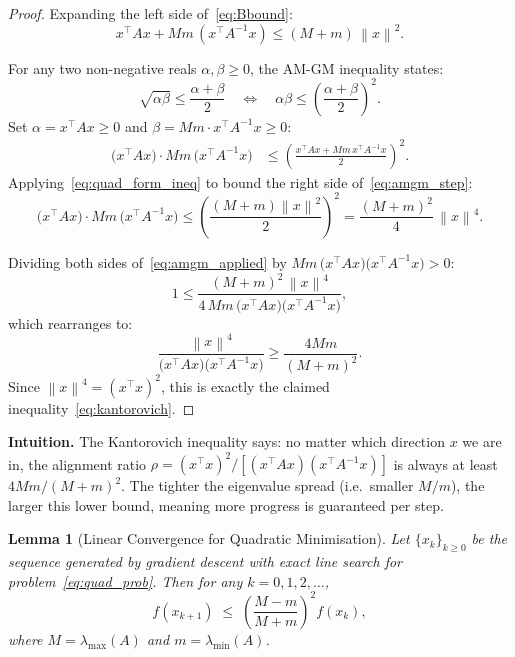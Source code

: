 \documentclass[11pt]{article}
\theoremstyle{definition}
\theoremstyle{plain}
\newtheorem{lemma}{Lemma}
\newcommand{\norm}[1]{\left\|#1\right\|}
\begin{document}
\begin{proof}
Expanding the left side of~\eqref{eq:Bbound}:
\begin{equation}\label{eq:quad_form_ineq}
  x^\top Ax + Mm\,(x^\top A^{-1}x) \leq (M+m)\,\norm{x}^2.
\end{equation}


For any two non-negative reals $\alpha,\beta\geq 0$, the AM-GM inequality states:
\[
  \sqrt{\alpha\beta} \leq \frac{\alpha+\beta}{2}
  \quad\Longleftrightarrow\quad
  \alpha\beta \leq \left(\frac{\alpha+\beta}{2}\right)^2.
\]
Set $\alpha = x^\top Ax \geq 0$ and $\beta = Mm\cdot x^\top A^{-1}x \geq 0$:
\begin{align}
  \bigl(x^\top Ax\bigr)\cdot Mm\,\bigl(x^\top A^{-1}x\bigr)
  &\leq \left(\frac{x^\top Ax + Mm\,x^\top A^{-1}x}{2}\right)^{\!2}. \label{eq:amgm_step}
\end{align}
Applying~\eqref{eq:quad_form_ineq} to bound the right side of~\eqref{eq:amgm_step}:
\begin{equation}\label{eq:amgm_applied}
  \bigl(x^\top Ax\bigr)\cdot Mm\,\bigl(x^\top A^{-1}x\bigr)
  \leq \left(\frac{(M+m)\norm{x}^2}{2}\right)^{\!2}
  = \frac{(M+m)^2}{4}\,\norm{x}^4.
\end{equation}

Dividing both sides of~\eqref{eq:amgm_applied} by $Mm\,\bigl(x^\top Ax\bigr)\bigl(x^\top A^{-1}x\bigr) > 0$:
\[
  1 \leq \frac{(M+m)^2\,\norm{x}^4}{4\,Mm\,\bigl(x^\top Ax\bigr)\bigl(x^\top A^{-1}x\bigr)},
\]
which rearranges to:
\[
  \frac{\norm{x}^4}{\bigl(x^\top Ax\bigr)\bigl(x^\top A^{-1}x\bigr)} \geq \frac{4Mm}{(M+m)^2}.
\]
Since $\norm{x}^4 = (x^\top x)^2$, this is exactly the claimed inequality~\eqref{eq:kantorovich}. \qedhere
\end{proof}

\noindent\textbf{Intuition.}
The Kantorovich inequality says: no matter which direction $x$ we are in,
the alignment ratio $\rho=(x^\top x)^2/[(x^\top Ax)(x^\top A^{-1}x)]$
is always at least $4Mm/(M+m)^2$. The tighter the eigenvalue spread
(i.e.\ smaller $M/m$), the larger this lower bound, meaning more progress
is guaranteed per step.

\begin{lemma}[Linear Convergence for Quadratic Minimisation]\label{lem:linear_conv}
Let $\{x_k\}_{k\geq 0}$ be the sequence generated by gradient descent with
exact line search for problem~\eqref{eq:quad_prob}. Then for any $k=0,1,2,\ldots$,
\begin{equation}\label{eq:linear_conv}
  f(x_{k+1})
  \;\leq\; \left(\frac{M-m}{M+m}\right)^{\!2} f(x_k),
\end{equation}
where $M=\lambda_{\max}(A)$ and $m=\lambda_{\min}(A)$.
\end{lemma}
\end{document}

